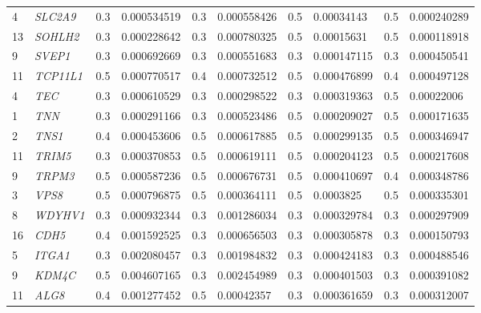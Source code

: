 \begin{refsection}
\begin{otherlanguage}{english}
\begin{scriptsize}
\begin{longtable}{llllllllll}
4 & \cellcolor[HTML]{FE996B}\textit{SLC2A9} & 0.3 & 0.000534519 & 0.3 & 0.000558426 & 0.5 & 0.00034143 & 0.5 & 0.000240289 \\
13 & \cellcolor[HTML]{FE996B}\textit{SOHLH2} & 0.3 & \cellcolor[HTML]{FE996B}0.000228642 & 0.3 & 0.000780325 & 0.5 & 0.00015631 & 0.5 & 0.000118918 \\
9 & \cellcolor[HTML]{FE996B}\textit{SVEP1} & 0.3 & 0.000692669 & 0.3 & 0.000551683 & 0.3 & 0.000147115 & 0.3 & 0.000450541 \\
11 & \cellcolor[HTML]{FE996B}\textit{TCP11L1} & 0.5 & 0.000770517 & 0.4 & 0.000732512 & 0.5 & 0.000476899 & 0.4 & 0.000497128 \\
4 & \cellcolor[HTML]{FE996B}\textit{TEC} & 0.3 & 0.000610529 & 0.3 & \cellcolor[HTML]{FE996B}0.000298522 & 0.3 & 0.000319363 & 0.5 & 0.00022006 \\
1 & \cellcolor[HTML]{FE996B}\textit{TNN} & 0.3 & \cellcolor[HTML]{FE996B}0.000291166 & 0.3 & 0.000523486 & 0.5 & 0.000209027 & 0.5 & 0.000171635 \\
2 & \cellcolor[HTML]{FE996B}\textit{TNS1} & 0.4 & \cellcolor[HTML]{FE996B}0.000453606 & 0.5 & 0.000617885 & 0.5 & 0.000299135 & 0.5 & 0.000346947 \\
11 & \cellcolor[HTML]{FE996B}\textit{TRIM5} & 0.3 & \cellcolor[HTML]{FE996B}0.000370853 & 0.5 & 0.000619111 & 0.5 & 0.000204123 & 0.5 & 0.000217608 \\
9 & \cellcolor[HTML]{FE996B}\textit{TRPM3} & 0.5 & 0.000587236 & 0.5 & 0.000676731 & 0.5 & 0.000410697 & 0.4 & 0.000348786 \\
3 & \cellcolor[HTML]{FE996B}\textit{VPS8} & 0.5 & 0.000796875 & 0.5 & \cellcolor[HTML]{FE996B}0.000364111 & 0.5 & 0.0003825 & 0.5 & 0.000335301 \\
8 & \cellcolor[HTML]{FE996B}\textit{WDYHV1} & 0.3 & 0.000932344 & 0.3 & 0.001286034 & 0.3 & 0.000329784 & 0.3 & 0.000297909 \\
16 & \cellcolor[HTML]{FE996B}\textit{CDH5} & 0.4 & 0.001592525 & 0.3 & 0.000656503 & 0.3 & 0.000305878 & 0.3 & 0.000150793 \\
5 & \cellcolor[HTML]{FE996B}\textit{ITGA1} & 0.3 & 0.002080457 & 0.3 & 0.001984832 & 0.3 & 0.000424183 & 0.3 & 0.000488546 \\
9 & \cellcolor[HTML]{FE996B}\textit{KDM4C} & 0.5 & 0.004607165 & 0.3 & 0.002454989 & 0.3 & 0.000401503 & 0.3 & 0.000391082 \\
11 & \cellcolor[HTML]{FE996B}\textit{ALG8} & 0.4 & 0.001277452 & 0.5 & \cellcolor[HTML]{FE996B}0.00042357 & 0.3 & 0.000361659 & 0.3 & 0.000312007 \\

\end{longtable}
\end{scriptsize}
\end{otherlanguage}
\end{refsection}
